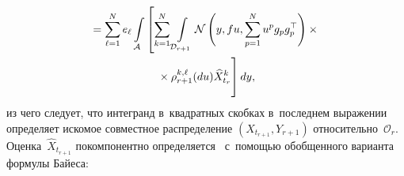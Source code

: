 \begin{multicols}{2}
\noindent
\begin{multline*}
 {}=
 \sum\limits_{\ell=1}^N e_{\ell} \int\limits_{\mathcal{A}} 
 \left[ \sum\limits_{k=1}^N 
 \int\limits_{\mathcal{D}_{r+1}} 
 \mathcal{N}\left(y,f u,\sum_{p=1}^N u^p g_pg_p^{\top}\right)\times{}\right.\\
\left. {}\times
 \rho^{k,\ell}_{r+1}(du)\widehat{X}_{t_r}^k
 \vphantom{\int\limits_A\sum\limits_{p=1}^N}
 \right] 
 dy,
 \end{multline*}
 из чего следует, что интегранд в~квадратных скобках в~последнем выражении 
 определяет искомое совместное распределение $(X_{t_{r+1}},Y_{r+1})$ 
 относительно~$ \mathcal{O}_r$. Оценка~$\widehat{X}_{t_{r+1}}$ покомпонентно 
 определяется~\cite{BSh_85} с~помощью обобщенного варианта формулы Байеса:

\end{multicols}
